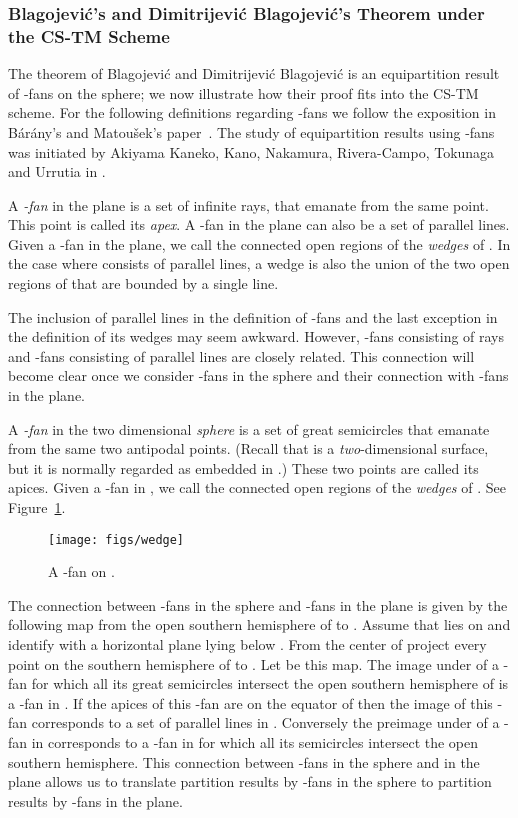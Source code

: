 \documentclass{article}
\begin{document}
\subsubsection{Blagojevi\'c's and Dimitrijevi\'c Blagojevi\'c's Theorem under the CS-TM Scheme}\label{sec:k_fan}

The theorem of Blagojevi\'c and Dimitrijevi\'c Blagojevi\'c
is an equipartition result of -fans on the sphere; 
we now illustrate how their proof fits into the CS-TM scheme.
For the following definitions regarding -fans we follow the exposition
in B\'ar\'any's and Matou{\v{s}}ek's paper~\cite{k-fan}.
The study of equipartition results using -fans was initiated
by Akiyama Kaneko, Kano, Nakamura, Rivera-Campo, Tokunaga and Urrutia
in \cite{jorge}.

A \emph{-fan} in the plane is a set of  infinite rays,
that emanate from the same point. This point is called 
its \emph{apex}. A -fan in the plane can also be a set of  parallel
lines. Given a -fan  in the plane, we call the connected
open regions of  
the \emph{wedges} of . In the case where 
 consists of parallel lines, a wedge is also the union of the two open regions of  
 that are bounded by a single
line.

The inclusion of  parallel lines in the definition
of -fans and the last exception in the definition of its wedges
may seem awkward. However, -fans consisting of rays
and -fans consisting of parallel lines are closely related.
This connection will become clear once we consider
-fans in the sphere and their connection with -fans in the plane.

A \emph{-fan} in the two dimensional \emph{sphere}  is a set
of  great semicircles that emanate from the same two antipodal points. (Recall that 
is a \emph{two}-dimensional surface, but it is normally regarded as embedded in .)
These two points are called its apices.  Given a -fan  in , we call the connected
open regions of  the \emph{wedges} of . See Figure~\ref{fig:wedge}.

\begin{figure}
  \begin{center}
   \texttt{[image: figs/wedge]}
\end{center}
\caption{A -fan on .}
\label{fig:wedge}
\end{figure}
The connection between -fans in the sphere
and -fans in the plane is given by the following map from
the open southern hemisphere of  to .
Assume that  lies on  and identify
 with a horizontal plane lying below .
From the center of  project every point on the southern
hemisphere of  to . Let  be this
map. The image under  of a -fan for which all its great semicircles
intersect the open southern hemisphere of  is a -fan
in . If the apices of this -fan are on the
equator of  then the image of this -fan corresponds
to a set of  parallel lines in . Conversely
the preimage under  of a -fan in  corresponds
to a -fan in  for which all its semicircles 
intersect the open southern hemisphere. 
This connection between -fans in the sphere and in the plane
allows us to translate partition results by -fans
in the sphere to partition results by -fans in the plane. 
\end{document}
